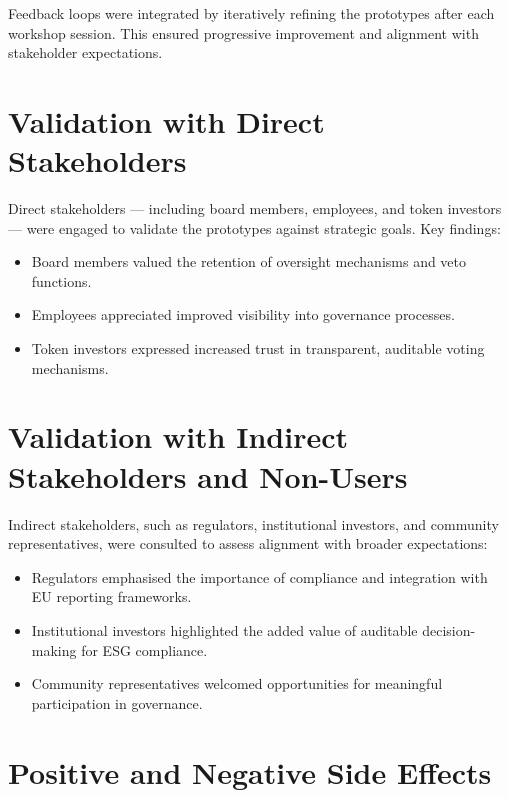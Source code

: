 \documentclass[
  english,
  12pt,
  oneside,
  open=any]{scrbook}
\providecommand{\tightlist}{%
  \setlength{\itemsep}{0pt}\setlength{\parskip}{0pt}}\usepackage{longtable,booktabs,array}
\begin{document}
Feedback loops were integrated by iteratively refining the prototypes
after each workshop session. This ensured progressive improvement and
alignment with stakeholder expectations.

\section{Validation with Direct Stakeholders}\label{sec-direct}

Direct stakeholders --- including board members, employees, and token
investors --- were engaged to validate the prototypes against strategic
goals. Key findings:

\begin{itemize}
\tightlist
\item
  Board members valued the retention of oversight mechanisms and veto
  functions.\\
\item
  Employees appreciated improved visibility into governance processes.\\
\item
  Token investors expressed increased trust in transparent, auditable
  voting mechanisms.
\end{itemize}

\section{Validation with Indirect Stakeholders and
Non-Users}\label{sec-indirect}

Indirect stakeholders, such as regulators, institutional investors, and
community representatives, were consulted to assess alignment with
broader expectations:

\begin{itemize}
\tightlist
\item
  Regulators emphasised the importance of compliance and integration
  with EU reporting frameworks.\\
\item
  Institutional investors highlighted the added value of auditable
  decision-making for ESG compliance.\\
\item
  Community representatives welcomed opportunities for meaningful
  participation in governance.
\end{itemize}

\section{Positive and Negative Side Effects}\label{sec-effects}
\end{document}
